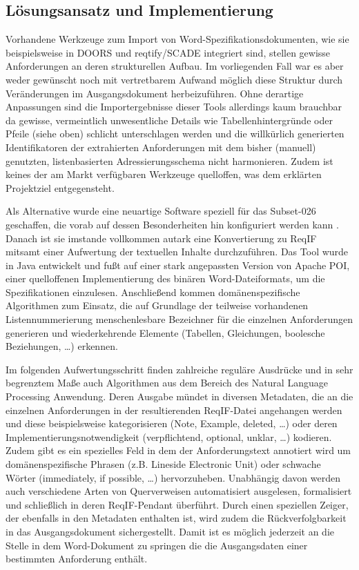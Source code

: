 \documentclass[twoside]{article}
\begin{document}
\begin{multicols}{2}
\subsection{Lösungsansatz und Implementierung}

Vorhandene Werkzeuge zum Import von Word-Spezifikationsdokumenten, wie sie beispielsweise in DOORS und reqtify/SCADE integriert sind, stellen gewisse Anforderungen an deren strukturellen Aufbau. Im vorliegenden Fall war es aber weder gewünscht noch mit vertretbarem Aufwand möglich diese Struktur durch Veränderungen im Ausgangsdokument herbeizuführen. Ohne derartige Anpassungen sind die Importergebnisse dieser Tools allerdings kaum brauchbar da gewisse, vermeintlich unwesentliche Details wie Tabellenhintergründe oder Pfeile (siehe oben) schlicht unterschlagen werden und die willkürlich generierten Identifikatoren der extrahierten Anforderungen mit dem bisher (manuell) genutzten, listenbasierten Adressierungsschema nicht harmonieren. Zudem ist keines der am Markt verfügbaren Werkzeuge quelloffen, was dem erklärten Projektziel entgegensteht.

Als Alternative wurde eine neuartige Software speziell für das \glqq{}Subset-026\grqq{} geschaffen, die vorab auf dessen Besonderheiten hin konfiguriert werden kann \cite{TodoMoriz}. Danach ist sie imstande vollkommen autark eine Konvertierung zu ReqIF mitsamt einer Aufwertung der textuellen Inhalte durchzuführen. Das Tool wurde in Java entwickelt und fußt auf einer stark angepassten Version von Apache POI, einer quelloffenen Implementierung des binären Word-Dateiformats, um die Spezifikationen einzulesen. Anschließend kommen domänenspezifische Algorithmen zum Einsatz, die auf Grundlage der teilweise vorhandenen Listennummerierung menschenlesbare Bezeichner für die einzelnen Anforderungen generieren und wiederkehrende Elemente (Tabellen, Gleichungen, boolesche Beziehungen, \ldots{}) erkennen.

Im folgenden Aufwertungsschritt finden zahlreiche reguläre Ausdrücke und in sehr begrenztem Maße auch Algorithmen aus dem Bereich des Natural Language Processing Anwendung. Deren Ausgabe mündet in diversen Metadaten, die an die einzelnen Anforderungen in der resultierenden ReqIF-Datei angehangen werden und diese beispielsweise kategorisieren (Note, Example, deleted, \ldots ) oder deren Implementierungsnotwendigkeit (verpflichtend, optional, unklar, \ldots ) kodieren. Zudem gibt es ein spezielles Feld in dem der Anforderungstext annotiert wird um domänenspezifische Phrasen (z.B. \glqq Lineside Electronic Unit\grqq ) oder schwache Wörter (\glqq{}immediately\grqq{}, \glqq{}if possible\grqq{}, \ldots{}) hervorzuheben. Unabhängig davon werden auch verschiedene Arten von Querverweisen automatisiert ausgelesen, formalisiert und schließlich in deren ReqIF-Pendant überführt. Durch einen speziellen Zeiger, der ebenfalls in den Metadaten enthalten ist, wird zudem die Rückverfolgbarkeit in das Ausgangsdokument sichergestellt. Damit ist es möglich jederzeit an die Stelle in dem Word-Dokument zu springen die die Ausgangsdaten einer bestimmten Anforderung enthält.


\end{multicols}
\end{document}
